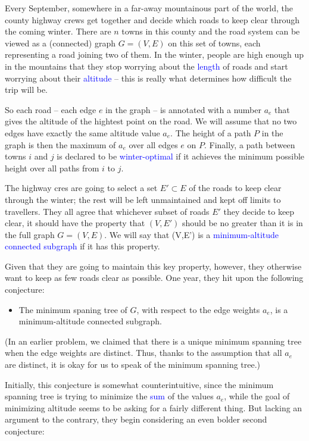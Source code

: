 \documentclass[11pt]{article}
\theoremstyle{numberplain}
\theoremstyle{nonumberplain}
\newcommand{\0}{{\mathbf{0}}}
\begin{document}
\begin{ques}[HW2,4-20]Every September, somewhere in a far-away mountainous part of the world, the county highway crews get together and decide which roads to keep clear through the coming winter. There are $n$ towns in this county and the road system can be viewed as a (connected) graph $G=(V,E)$ on this set of towns, each representing a road joining two of them. In the winter, people are high enough up in the mountains that they stop worrying about the \textcolor{blue}{length} of roads and start worrying about their \textcolor{blue}{altitude} -- this is really what determines how difficult the trip will be. \par
So each road -- each edge $e$ in the graph -- is annotated with a number $a_e$ that gives the altitude of the hightest point on the road. We will assume that no two edges have exactly the same altitude value $a_e$. The height of a path $P$ in the graph is then the maximum of $a_e$ over all edges $e$ on $P$. Finally, a path between towns $i$ and $j$ is declared to be \textcolor{blue}{winter-optimal} if it achieves the minimum possible height over all paths from $i$ to $j$.\par
The highway cres are going to select a set $E'\subset E$ of the roads to keep clear through the winter; the rest will be left unmaintained and kept off limits to travellers. They all agree that whichever subset of roads $E'$ they decide to keep clear, it should have the property that $(V,E')$ should be no greater than it is in the full graph $G=(V,E)$. We will say that (V,E') is a \textcolor{blue}{minimum-altitude connected subgraph}  if it has this property.\par
Given that they are going to maintain this key property, however, they otherwise want to keep as few roads clear as possible. One year, they hit upon the following conjecture:
\begin{itemize}
\item 
The minimum spaning tree of $G$, with respect to the edge weights $a_e$, is a minimum-altitude connected subgraph.
\end{itemize}
(In an earlier problem, we claimed that there is a unique minimum spanning tree when the edge weights are distinct. Thus, thanks to the assumption that all $a_e$ are distinct, it is okay for us to speak of the minimum spanning tree.)\par
Initially, this conjecture is somewhat counterintuitive, since the minimum spanning tree is trying to minimize the \textcolor{blue}{sum} of the values $a_e$, while the goal of minimizing altitude seems to be asking for a fairly different thing. But lacking an argument to the contrary, they begin considering an even bolder second conjecture:

\end{ques}
\end{document}
